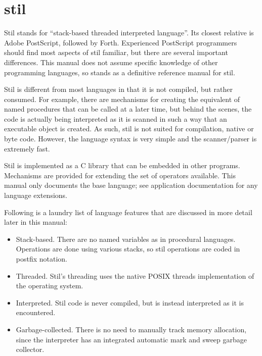 %
%
%
%
%              

\clearemptydoublepage
\chapter{stil}
\label{stillang}

Stil stands for ``stack-based threaded interpreted language''.  Its closest
relative is Adobe PostScript, followed by Forth.  Experienced PostScript
programmers should find most aspects of stil familiar, but there are several
important differences.  This manual does not assume specific knowledge of other
programming languages, so stands as a definitive reference manual for stil.

Stil is different from most languages in that it is not compiled, but rather
consumed.  For example, there are mechanisms for creating the equivalent of
named procedures that can be called at a later time, but behind the scenes, the
code is actually being interpreted as it is scanned in such a way that an
executable object is created.  As such, stil is not suited for compilation,
native or byte code.  However, the language syntax is very simple and the
scanner/parser is extremely fast.

Stil is implemented as a C library that can be embedded in other programs.
Mechanisms are provided for extending the set of operators available.  This
manual only documents the base language; see application documentation for any
language extensions.

Following is a laundry list of language features that are discussed in more
detail later in this manual:

\begin{itemize}
\item{Stack-based.  There are no named variables as in procedural languages.
Operations are done using various stacks, so stil operations are coded in
postfix notation.}
\item{Threaded.  Stil's threading uses the native POSIX threads implementation
of the operating system.}
\item{Interpreted.  Stil code is never compiled, but is instead interpreted as
it is encountered.}
\item{Garbage-collected.  There is no need to manually track memory allocation,
since the interpreter has an integrated automatic mark and sweep garbage
collector.}
\end{itemize}

